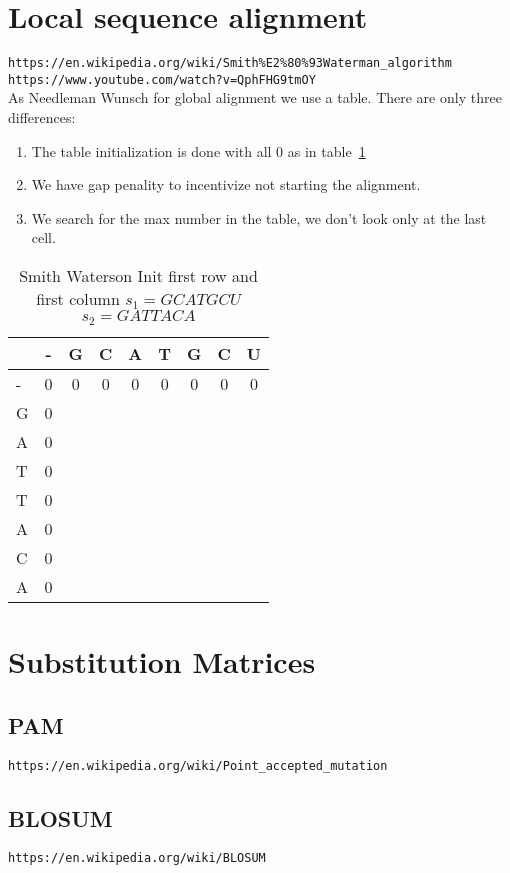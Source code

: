 \documentclass[11pt]{article}
\begin{document}
\newpage
\section{Local sequence alignment} %
\label{sec:local_sequence_alignment}
\texttt{https://en.wikipedia.org/wiki/Smith\%E2\%80\%93Waterman\_algorithm}\\
\texttt{https://www.youtube.com/watch?v=QphFHG9tmOY}\\
As Needleman Wunsch for global alignment we use a table. There are only three differences:
\begin{enumerate}
	\item The table initialization is done with all 0 as in table~\ref{tab:SW_init}
	\item We have gap penality to incentivize not starting the alignment.
	\item We search for the max number in the table, we don't look only at the last cell.
\end{enumerate}

\begin{table}[h]
	\caption{Smith Waterson Init first row and first column $s_1 = GCATGCU$ $s_2 = GATTACA$}
	\label{tab:SW_init}
	\centering

	\begin{tabular}{l|c ccccccc}
	\hline

	\hline
		  & - & G & C & A & T & G & C & U \\
	\hline
	 	- & 0  & 0 & 0 & 0 & 0 & 0 & 0 & 0 \\
	 	G & 0  &   &   &   &   &   &   &   \\
	 	A & 0  &   &   &   &   &   &   &   \\
	 	T & 0  &   &   &   &   &   &   &   \\
	 	T & 0  &   &   &   &   &   &   &   \\
	 	A & 0  &   &   &   &   &   &   &   \\
	 	C & 0  &   &   &   &   &   &   &   \\
	 	A & 0  &   &   &   &   &   &   &   \\
	

	\hline
	\end{tabular}
\end{table}

\newpage
\section{Substitution Matrices} %
\label{sec:substitution_matrices}
\subsection{PAM} %
\label{sub:pam}
\texttt{https://en.wikipedia.org/wiki/Point\_accepted\_mutation}

\subsection{BLOSUM} %
\label{sub:blosum}
\texttt{https://en.wikipedia.org/wiki/BLOSUM}
\end{document}
